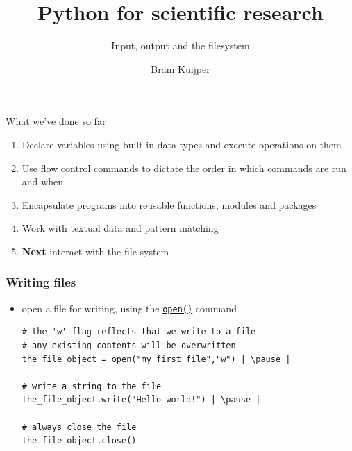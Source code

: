 \documentclass[xcolor=table]{beamer}
\title[Python for scientific research]{Python for scientific research}
\subtitle{Input, output and the filesystem}
\author{Bram Kuijper}
\institute[]{University of Exeter, Penryn Campus, UK}
\begin{document}
\begin{frame}
\titlepage
\end{frame}

\begin{frame}{What we've done so far}

	\begin{enumerate}\addtolength{\itemsep}{1\baselineskip}
		\item Declare variables using built-in data types and execute operations
		on them
		\item Use flow control commands to dictate the order in which commands are run
		and when
		\item Encapsulate programs into reusable functions, modules and packages
        \item Work with textual data and pattern matching
        \item \textbf{Next} interact with the file system
	\end{enumerate}

\end{frame}

\begin{frame}[fragile]
    \frametitle{Writing files}
\begin{itemize}
    \item open a file for writing, using the \href{https://docs.python.org/3/library/functions.html#open}{\texttt{open()}} command \pause
\begin{lstlisting}[style=python]
# the 'w' flag reflects that we write to a file
# any existing contents will be overwritten
the_file_object = open("my_first_file","w") | \pause |

# write a string to the file
the_file_object.write("Hello world!") | \pause |

# always close the file
the_file_object.close()
\end{lstlisting}
\end{itemize}
\end{frame}

\end{document}

